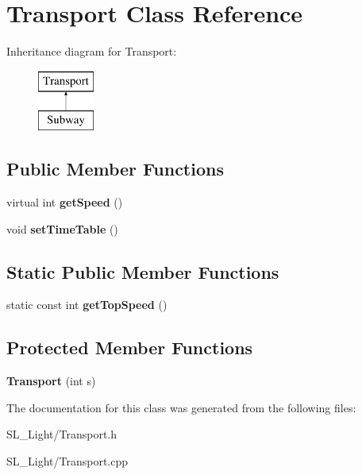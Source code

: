 \hypertarget{class_transport}{}\section{Transport Class Reference}
\label{class_transport}
Inheritance diagram for Transport\+:\begin{figure}[H]
\begin{center}
\leavevmode
\includegraphics[height=2.000000cm]{class_transport}
\end{center}
\end{figure}
\subsection*{Public Member Functions}
\begin{DoxyCompactItemize}
\item 
\mbox{\label{class_transport_a91ac99519072a7e3c7322022ef8c6ee8}} 
virtual int {\bfseries get\+Speed} ()
\item 
\mbox{\label{class_transport_ad3311c10df5f3727835cc5dddec2fa60}} 
void {\bfseries set\+Time\+Table} ()
\end{DoxyCompactItemize}
\subsection*{Static Public Member Functions}
\begin{DoxyCompactItemize}
\item 
\mbox{\label{class_transport_a940831d98071a6dcc218e8bed7f0b869}} 
static const int {\bfseries get\+Top\+Speed} ()
\end{DoxyCompactItemize}
\subsection*{Protected Member Functions}
\begin{DoxyCompactItemize}
\item 
\mbox{\label{class_transport_a8e5ca1f59f6748fd887c5c50e2050955}} 
{\bfseries Transport} (int s)
\end{DoxyCompactItemize}


The documentation for this class was generated from the following files\+:\begin{DoxyCompactItemize}
\item 
S\+L\+\_\+\+Light/Transport.\+h\item 
S\+L\+\_\+\+Light/Transport.\+cpp\end{DoxyCompactItemize}

